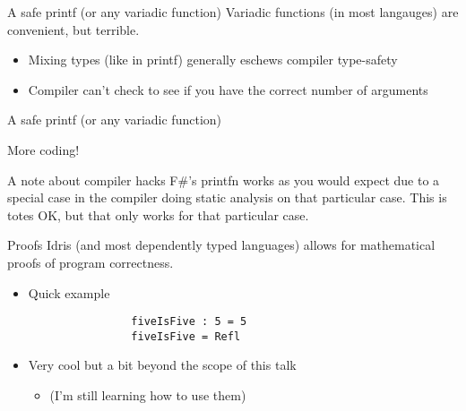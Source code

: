 \documentclass{beamer}
\begin{document}
\begin{frame}{A safe printf (or any variadic function)}
	\transdissolve
	Variadic functions (in most langauges) are convenient, but terrible.
	\begin{itemize}
	  \pause
          \item Mixing types (like in printf) generally eschews compiler type-safety
	  \pause
	  \item Compiler can't check to see if you have the correct number of arguments
	\end{itemize}
\end{frame}
\begin{frame}{A safe printf (or any variadic function)}
	\transdissolve[duration=0.3]
	\begin{center} 
	  More coding!
	\end{center}
\end{frame}
\begin{frame}{A note about compiler hacks}
 		\transdissolve
  F\#'s printfn works as you would expect due to a special case in the compiler doing static analysis on that particular case. 
  \linebreak
  \linebreak
  \pause
  This is totes OK, but that only works for that particular case.
\end{frame}
\begin{frame}[fragile]{Proofs}
	\transdissolve[duration=0.3]
	Idris (and most dependently typed languages) allows for mathematical proofs of program correctness. 
	\begin{itemize}
		\pause
		\item Quick example
			\begin{lstlisting}
				fiveIsFive : 5 = 5
				fiveIsFive = Refl
			\end{lstlisting}

		\pause
		\item Very cool but a bit beyond the scope of this talk \begin{itemize} 
				\pause
				\item (I'm still learning how to use them)
			\end{itemize}
	\end{itemize}
\end{frame}
\end{document}
